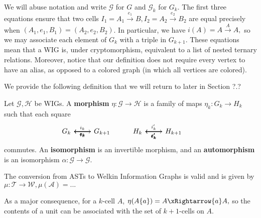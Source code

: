 We will abuse notation and write $\mathcal{G}$ for $G$ and $\mathcal{G}_{k}$ for $G_{k}.$
The first three equations ensure that two cells $I_{1} = A_{1} \xrightarrow{e_{1}} B, I_{2} = A_{2} \xrightarrow{e_{2}} B_{2}$ are equal precisely when $(A_{1}, e_{1}, B_{1}) = (A_{2}, e_{2}, B_{2})$. In particular, we have $i(A) = A \xrightarrow{A} A,$ so we may associate each element of $G_{k}$ with a triple in $G_{k+1}.$ These equations mean that a WIG is, under cryptomorphism, equivalent to a list of nested ternary relations. Moreover, notice that our definition does not require every vertex to have an alias, as opposed to a colored graph (in which all vertices are colored).

We provide the following definition that we will return to later in Section ?.?
\begin{definition} Let $\mathcal{G}, \mathcal{H}$ be WIGs. A \textbf{morphism} $\eta: \mathcal{G} \to \mathcal{H}$ is a family of maps $\eta_{k}: G_{k} \to H_{k}$ such that each square
\begin{equation*}
\begin{tikzcd}
  G_{k} \arrow[r, "i_{k}"] &%
  G_{k+1} \arrow[l, "s_{k}"] \arrow[l, "t_{k}"] \arrow[l, "c_{k}"] &
  H_{k} \arrow[r, "i'_{k}"] &
  H_{k+1} \arrow[l, "s'_{k}"] \arrow[l, "t'_{k}"] \arrow[l, "c'_{k}"] &
\end{tikzcd}
\end{equation*}
commutes. An \textbf{isomorphism} is an invertible morphism, and an \textbf{automorphism} is an isomorphism $\alpha: \mathcal{G} \to \mathcal{G}.$
\end{definition}

\begin{lemma}
  The conversion from ASTs to Welkin Information Graphs is valid and is given by $\mu: \mathcal{T} \to \mathcal{W}, \mu(\mathcal{A}) = ...$
\end{lemma}
As a major consequence, for a $k$-cell $A$, $\eta(A \{ a \}) = A \xRightarrow{a} A,$ so the contents of a unit can be associated with the set of $k+1$-cells on $A.$

